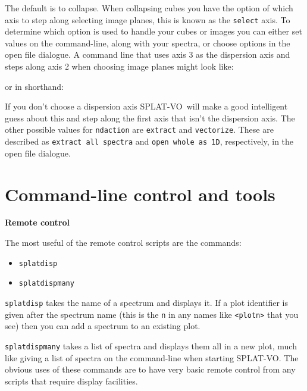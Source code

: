 \documentclass[twoside,11pt,nolof]{starlink}
\providecommand{\SPLAT}{\textsf{SPLAT-VO}}
\providecommand{\hitext}[1]{\texttt{#1}}
\providecommand{\subheading}[1]{\textbf{\large{#1}}}
\begin{document}
The default is to collapse. When collapsing cubes you have the option of which
axis to step along selecting image planes, this is known as the
\hitext{select} axis. To determine which option is used to handle your cubes or
images you can either set values on the command-line, along with your spectra,
or choose options in the open file dialogue. A command line that uses axis 3 as
the dispersion axis and steps along axis 2 when choosing image planes might
look like:
\begin{quote}
\begin{terminalv}
\end{terminalv}
\end{quote}
or in shorthand:
\begin{quote}
\begin{terminalv}
\end{terminalv}
\end{quote}
If you don't choose a dispersion axis \SPLAT\ will make a good intelligent
guess about this and step along the first axis that isn't the dispersion axis.
The other possible values for \hitext{ndaction} are \hitext{extract} and
\hitext{vectorize}. These are described as \hitext{extract all spectra}
and \hitext{open whole as 1D}, respectively, in the open file dialogue.

\section{Command-line control and tools}

\subheading{Remote control}

The most useful of the remote control scripts are the commands:
\begin{itemize}
 \item \hitext{splatdisp}
 \item \hitext{splatdispmany}
\end{itemize}
\hitext{splatdisp} takes the name of a spectrum and displays it.
If a plot identifier is given after the spectrum name (this is the
\hitext{n} in any names like \hitext{<plotn>} that you see) then you
can add a spectrum to an existing plot.

\hitext{splatdispmany} takes a list of spectra and displays them all in a
new plot, much like giving a list of spectra on the command-line when
starting \SPLAT. The obvious uses of these commands are to have very
basic remote control from any scripts that require display facilities.
\end{document}
